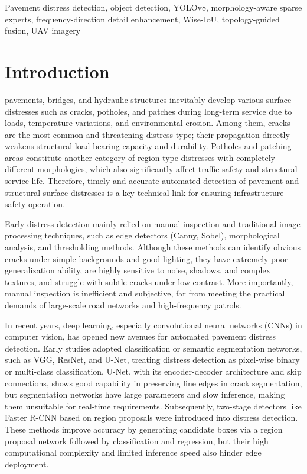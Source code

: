 \documentclass{ieeeaccess}
\begin{document}
{\begin{keywords}
Pavement distress detection, object detection, YOLOv8, morphology-aware sparse experts, frequency-direction detail enhancement, Wise-IoU, topology-guided fusion, UAV imagery
\end{keywords}

\titlepgskip=-15pt
\maketitle

\section{Introduction}

 pavements, bridges, and hydraulic structures inevitably develop various surface distresses such as cracks, potholes, and patches during long-term service due to loads, temperature variations, and environmental erosion. Among them, cracks are the most common and threatening distress type; their propagation directly weakens structural load-bearing capacity and durability. Potholes and patching areas constitute another category of region-type distresses with completely different morphologies, which also significantly affect traffic safety and structural service life. Therefore, timely and accurate automated detection of pavement and structural surface distresses is a key technical link for ensuring infrastructure safety operation.

Early distress detection mainly relied on manual inspection and traditional image processing techniques, such as edge detectors (Canny, Sobel), morphological analysis, and thresholding methods. Although these methods can identify obvious cracks under simple backgrounds and good lighting, they have extremely poor generalization ability, are highly sensitive to noise, shadows, and complex textures, and struggle with subtle cracks under low contrast. More importantly, manual inspection is inefficient and subjective, far from meeting the practical demands of large-scale road networks and high-frequency patrols.

In recent years, deep learning, especially convolutional neural networks (CNNs) in computer vision, has opened new avenues for automated pavement distress detection. Early studies adopted classification or semantic segmentation networks, such as VGG, ResNet, and U-Net, treating distress detection as pixel-wise binary or multi-class classification. U-Net, with its encoder-decoder architecture and skip connections, shows good capability in preserving fine edges in crack segmentation, but segmentation networks have large parameters and slow inference, making them unsuitable for real-time requirements. Subsequently, two-stage detectors like Faster R-CNN based on region proposals were introduced into distress detection. These methods improve accuracy by generating candidate boxes via a region proposal network followed by classification and regression, but their high computational complexity and limited inference speed also hinder edge deployment.

}
\end{document}
